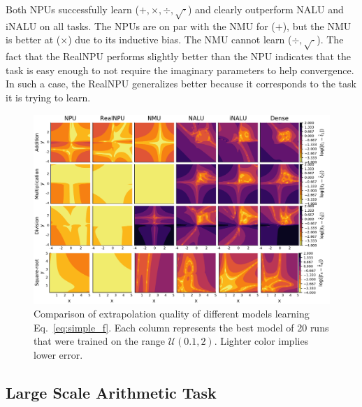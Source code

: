 \documentclass[9pt]{article}
\begin{document}
Both NPUs successfully learn ($+,\times,\div,\sqrt{\cdot}$) and clearly
outperform NALU and iNALU on all tasks.  The NPUs are on par with the NMU for
($+$), but the NMU is better at ($\times$) due to its inductive bias. The NMU
cannot learn ($\div,\sqrt{\cdot}$). The fact that the RealNPU performs slightly better
than the NPU indicates that the task is easy enough to not require the
imaginary parameters to help convergence. In such a case, the RealNPU
generalizes better because it corresponds to the task it
is trying to learn.
\begin{figure}
  \centering
  \includegraphics[width=0.7\linewidth]{simple_err.pdf}
  \caption{Comparison of extrapolation quality of different models learning Eq.~\ref{eq:simple_f}. Each
  column represents the best model of 20 runs that were trained on the range
  $\mathcal{U}(0.1,2)$.  Lighter color implies lower error.}%
  \label{fig:simple_err}
\end{figure}

\subsection{Large Scale Arithmetic Task}%
\label{sub:large_scale_arithmetic_task}
\end{document}
